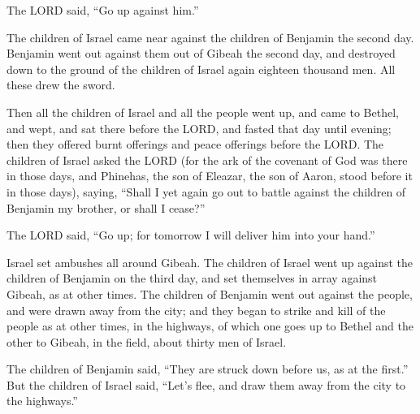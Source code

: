 The LORD said, ``Go up against him.''

 The children of Israel came near against the children of
Benjamin the second day.  Benjamin went out against them
out of Gibeah the second day, and destroyed down to the ground of the
children of Israel again eighteen thousand men. All these drew the
sword.

 Then all the children of Israel and all the people went
up, and came to Bethel, and wept, and sat there before the LORD, and
fasted that day until evening; then they offered burnt offerings and
peace offerings before the LORD.  The children of Israel
asked the LORD (for the ark of the covenant of God was there in those
days,  and Phinehas, the son of Eleazar, the son of Aaron,
stood before it in those days), saying, ``Shall I yet again go out to
battle against the children of Benjamin my brother, or shall I cease?''

The LORD said, ``Go up; for tomorrow I will deliver him into your
hand.''

 Israel set ambushes all around Gibeah.  The
children of Israel went up against the children of Benjamin on the third
day, and set themselves in array against Gibeah, as at other times.
 The children of Benjamin went out against the people, and
were drawn away from the city; and they began to strike and kill of the
people as at other times, in the highways, of which one goes up to
Bethel and the other to Gibeah, in the field, about thirty men of
Israel.

 The children of Benjamin said, ``They are struck down
before us, as at the first.'' But the children of Israel said, ``Let's
flee, and draw them away from the city to the highways.''

